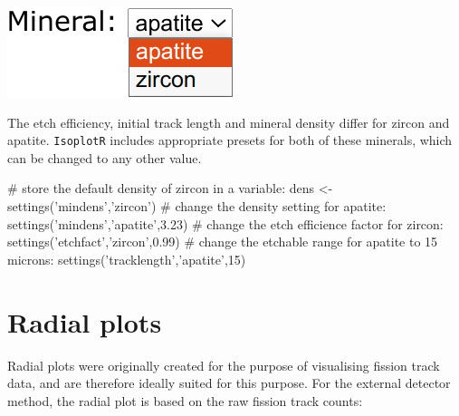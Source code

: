 \begin{refsection}
\begin{enumerate}
\noindent\begin{minipage}[t]{.20\linewidth}
\strut\vspace*{-\baselineskip}\newline
\includegraphics[width=\linewidth]{../figures/FTmineral.png}
\end{minipage}
\begin{minipage}[t]{.80\linewidth}
  The etch efficiency, initial track length and mineral density differ
  for zircon and apatite. \texttt{IsoplotR} includes appropriate
  presets for both of these minerals, which can be changed to any
  other value.
\end{minipage}

\begin{script}
# store the default density of zircon in a variable:
dens <- settings('mindens','zircon') 
# change the density setting for apatite:
settings('mindens','apatite',3.23)
# change the etch efficience factor for zircon:
settings('etchfact','zircon',0.99)
# change the etchable range for apatite to 15 microns:
settings('tracklength','apatite',15)
\end{script}

\end{enumerate}

\section{Radial plots}\label{FT-radial-R}

Radial plots were originally created for the purpose of visualising
fission track data, and are therefore ideally suited for this purpose.
For the external detector method, the radial plot is based on the raw
fission track counts:\\


\end{refsection}
